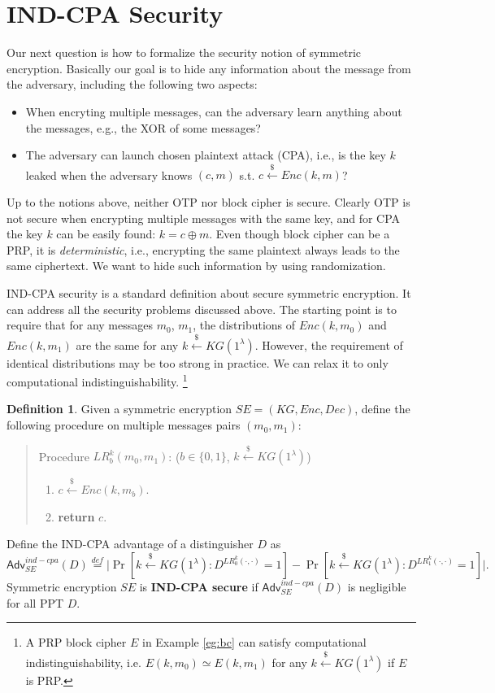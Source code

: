\documentclass[12pt]{article}
\newcommand{\eqdef}{\stackrel{def}{=}}
\newcommand{\bits}{\{0,1\}}
\newcommand{\getsr}{\stackrel{\$}{\gets}}
\newcommand{\Adv}{\mathsf{Adv}}
\theoremstyle{definition}
\newtheorem{definition}[theorem]{Definition}
\begin{document}
\section{IND-CPA Security}
Our next question is how to formalize the security notion of symmetric encryption. Basically our goal is to hide any information about the message from the adversary, including the following two aspects:
\begin{itemize}
\item When encryting multiple messages, can the adversary learn anything about the messages, e.g., the XOR of some messages?
\item The adversary can launch chosen plaintext attack (CPA), i.e., is the key $k$ leaked when the adversary knows $(c, m)$ s.t. $c \getsr Enc(k, m)$?
\end{itemize}
Up to the notions above, neither OTP nor block cipher is secure. 
Clearly OTP is not secure when encrypting multiple messages with the same key, and for CPA the key $k$ can be easily found: $k = c \oplus m$. 
Even though block cipher can be a PRP, it is \emph{deterministic}, i.e., encrypting the same plaintext always leads to the same ciphertext. We want to hide such information by using randomization.

IND-CPA security is a standard definition about secure symmetric encryption. It can address all the security problems discussed above.
The starting point is to require that for any messages $m_0$, $m_1$, the distributions of $Enc(k, m_0)$ and $Enc(k, m_1)$ are the same for any $k \getsr KG(1^\lambda)$. However, the requirement of identical distributions may be too strong in practice. We can relax it to only computational indistinguishability. \footnote{A PRP block cipher $E$ in Example \ref{eg:bc} can satisfy computational indistinguishability, i.e. $E(k, m_0) \simeq E(k, m_1)$ for any $k \getsr KG(1^\lambda)$ if $E$ is PRP.}

\begin{definition}
\label{def:ic}
Given a symmetric encryption $SE = (KG, Enc, Dec)$, define the following procedure on multiple messages pairs $(m_0, m_1)$:
\begin{quote}
Procedure $LR_b^k(m_0, m_1)$: ($b \in \bits$, $k \getsr KG(1^\lambda)$)
\begin{enumerate}
\item $c \getsr Enc(k, m_b)$.
\item {\bf return} $c$.
\end{enumerate}
\end{quote}

Define the IND-CPA advantage of a distinguisher $D$ as
$$\Adv_{SE}^{ind-cpa}(D) \eqdef \bigg| \Pr[k \getsr KG(1^\lambda) : D^{LR_0^k(\cdot, \cdot)}=1] - \Pr[k \getsr KG(1^\lambda) : D^{LR_1^k(\cdot, \cdot)}=1] \bigg|.$$
Symmetric encryption $SE$ is {\bf IND-CPA secure} if $\Adv_{SE}^{ind-cpa}(D)$ is negligible for all PPT $D$.
\end{definition}
\end{document}
